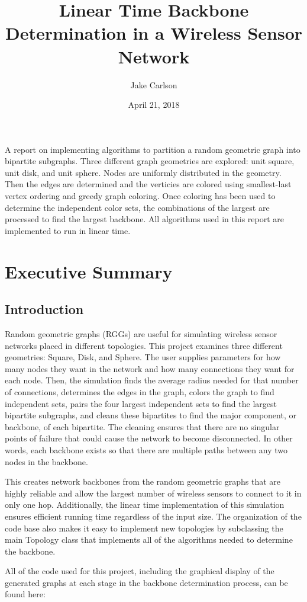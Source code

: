 \documentclass{article}
\begin{document}
\title{Linear Time Backbone Determination in a Wireless Sensor Network}
\author{Jake Carlson}
\date{April 21, 2018}
\maketitle

\abstract
A report on implementing algorithms to partition a random geometric graph into bipartite subgraphs. Three different graph geometries are explored: unit square, unit disk, and unit sphere. Nodes are uniformly distributed in the geometry. Then the edges are determined and the verticies are colored using smallest-last vertex ordering and greedy graph coloring. Once coloring has been used to determine the independent color sets, the combinations of the largest are processed to find the largest backbone. All algorithms used in this report are implemented to run in linear time.
\newpage

\tableofcontents
\lstlistoflistings
\newpage

\section{Executive Summary}

    \subsection{Introduction}
    Random geometric graphs (RGGs) are useful for simulating wireless sensor networks placed in different topologies. This project examines three different geometries: Square, Disk, and Sphere. The user supplies parameters for how many nodes they want in the network and how many connections they want for each node. Then, the simulation finds the average radius needed for that number of connections, determines the edges in the graph, colors the graph to find independent sets, pairs the four largest independent sets to find the largest bipartite subgraphs, and cleans these bipartites to find the major component, or backbone, of each bipartite. The cleaning ensures that there are no singular points of failure that could cause the network to become disconnected. In other words, each backbone exists so that there are multiple paths between any two nodes in the backbone.
    \par
    This creates network backbones from the random geometric graphs that are highly reliable and allow the largest number of wireless sensors to connect to it in only one hop. Additionally, the linear time implementation of this simulation ensures efficient running time regardless of the input size. The organization of the code base also makes it easy to implement new topologies by subclassing the main Topology class that implements all of the algorithms needed to determine the backbone.
    \par
    All of the code used for this project, including the graphical display of the generated graphs at each stage in the backbone determination process, can be found here:
\end{document}
